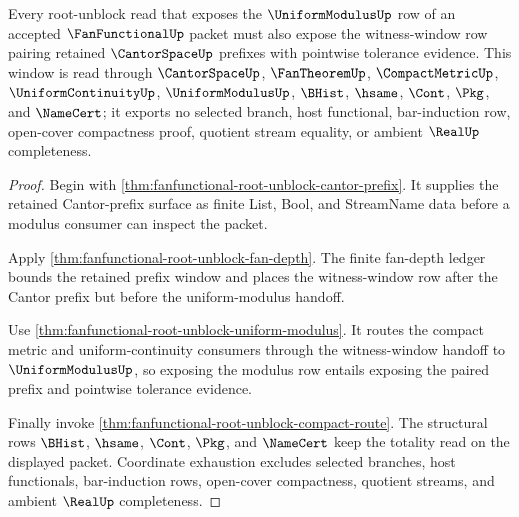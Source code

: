 \begin{theorem}
\label{thm:fanfunctional-root-unblock-witness-window-totality}
Every root-unblock read that exposes the $\UniformModulusUp$ row of an accepted $\FanFunctionalUp$ packet must also expose the witness-window row pairing retained $\CantorSpaceUp$ prefixes with pointwise tolerance evidence. This window is read through $\CantorSpaceUp$, $\FanTheoremUp$, $\CompactMetricUp$, $\UniformContinuityUp$, $\UniformModulusUp$, $\BHist$, $\hsame$, $\Cont$, $\Pkg$, and $\NameCert$; it exports no selected branch, host functional, bar-induction row, open-cover compactness proof, quotient stream equality, or ambient $\RealUp$ completeness.
\end{theorem}
\begin{proof}
Begin with \autoref{thm:fanfunctional-root-unblock-cantor-prefix}. It supplies the retained Cantor-prefix surface as finite List, Bool, and StreamName data before a modulus consumer can inspect the packet.

Apply \autoref{thm:fanfunctional-root-unblock-fan-depth}. The finite fan-depth ledger bounds the retained prefix window and places the witness-window row after the Cantor prefix but before the uniform-modulus handoff.

Use \autoref{thm:fanfunctional-root-unblock-uniform-modulus}. It routes the compact metric and uniform-continuity consumers through the witness-window handoff to $\UniformModulusUp$, so exposing the modulus row entails exposing the paired prefix and pointwise tolerance evidence.

Finally invoke \autoref{thm:fanfunctional-root-unblock-compact-route}. The structural rows $\BHist$, $\hsame$, $\Cont$, $\Pkg$, and $\NameCert$ keep the totality read on the displayed packet. Coordinate exhaustion excludes selected branches, host functionals, bar-induction rows, open-cover compactness, quotient streams, and ambient $\RealUp$ completeness.
\end{proof}

